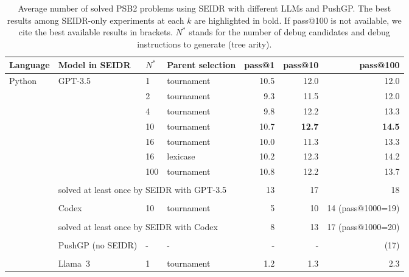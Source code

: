 \begin{table}[t]
    \centering
    \caption{Average number of solved PSB2 problems using SEIDR with different LLMs and PushGP. The best results among SEIDR-only experiments at each $k$ are highlighted in bold. If pass@100 is not available, we cite the best available results in brackets. $N^*$ stands for the number of debug candidates and debug instructions to generate (tree arity).}\small
    \label{tab:generalizability-psb2}
\begin{tabular}{llllrrr}
\toprule
Language & Model in SEIDR & $N^*$ & Parent selection &  pass@1 &  pass@10 &  pass@100 \\
\midrule
% 
Python & GPT-3.5 & 1   &         tournament &    10.5 &     12.0 &      12.0 \\
    &        & 2   &         tournament &     9.3 &     11.5 &      12.0 \\
    &        & 4   &         tournament &     9.8 &     12.2 &      13.3 \\
    &        & 10  &         tournament &    10.7 &     \textbf{12.7} &      \textbf{14.5} \\
    &        & 16  &         tournament &    10.0 &     11.3 &      13.3 \\
    &        & 16  &           lexicase &    10.2 &     12.3 &      14.2 \\
    &        & 100 &         tournament &    10.8 &     12.2 &      13.7 \\
\cline{3-7}\\[-8pt]
    &  \multicolumn{3}{l}{solved at least once by SEIDR with GPT-3.5} &  13 &       17 &       18 \\[1pt]
\cline{2-7}\\[-8pt]
        & Codex  & 10 & tournament &      5 &       10 &        14 (pass@1000=19) \\[1pt]
\cline{3-7}\\[-8pt]
       &  \multicolumn{3}{l}{solved at least once by SEIDR with Codex}   & 8 &       13 &        17 (pass@1000=20) \\[3pt]
\cline{2-7}\\[-8pt]
        &  PushGP (no SEIDR)   &    -            &       - &        - &       - &  (17)\\[1pt]
\cline{2-7}\\[-8pt]
% 
        & Llama~3 & 1   &         tournament &     1.2 &      1.3 &       2.3 \\

\end{tabular}
\end{table}
